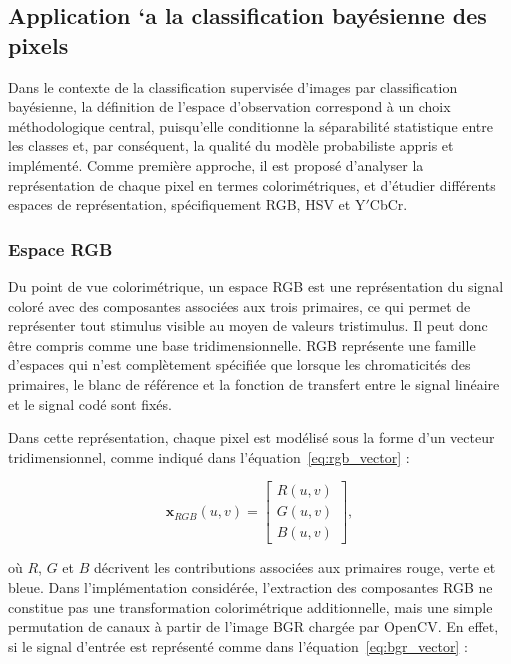 \subsection{Application `a la classification bayésienne des pixels}

Dans le contexte de la classification supervisée d’images par classification bayésienne, la définition de l’espace d’observation correspond à un choix méthodologique central, puisqu’elle conditionne la séparabilité statistique entre les classes et, par conséquent, la qualité du modèle probabiliste appris et implémenté. Comme première approche, il est proposé d’analyser la représentation de chaque pixel en termes colorimétriques, et d’étudier différents espaces de représentation, spécifiquement RGB, HSV et Y$'$CbCr.

\subsubsection{Espace RGB}

Du point de vue colorimétrique, un espace RGB est une représentation du signal coloré avec des composantes associées aux trois primaires, ce qui permet de représenter tout stimulus visible au moyen de valeurs tristimulus. Il peut donc être compris comme une base tridimensionnelle. RGB représente une famille d’espaces qui n’est complètement spécifiée que lorsque les chromaticités des primaires, le blanc de référence et la fonction de transfert entre le signal linéaire et le signal codé sont fixés.

Dans cette représentation, chaque pixel est modélisé sous la forme d’un vecteur tridimensionnel, comme indiqué dans l’équation~\eqref{eq:rgb_vector} :

\begin{equation}
\mathbf{x}_{RGB}(u,v)=
\begin{bmatrix}
R(u,v)\\
G(u,v)\\
B(u,v)
\end{bmatrix},
\label{eq:rgb_vector}
\end{equation}

où $R$, $G$ et $B$ décrivent les contributions associées aux primaires rouge, verte et bleue. Dans l’implémentation considérée, l’extraction des composantes RGB ne constitue pas une transformation colorimétrique additionnelle, mais une simple permutation de canaux à partir de l’image BGR chargée par OpenCV. En effet, si le signal d’entrée est représenté comme dans l’équation~\eqref{eq:bgr_vector} :

